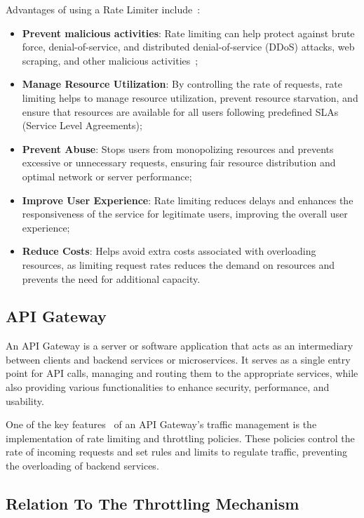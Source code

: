 Advantages of using a Rate Limiter include~\cite{solo-io-rate-limiting, kong-rate-limiting}:

\begin{itemize}
    \item \textbf{Prevent malicious activities}: Rate limiting can help protect against brute force, denial-of-service, and distributed denial-of-service (DDoS) attacks, web scraping, and other malicious activities~\cite{cloudflare-rate-limiting};
    \item \textbf{Manage Resource Utilization}: By controlling the rate of requests, rate limiting helps to manage resource utilization, prevent resource starvation, and ensure that resources are available for all users following predefined SLAs (Service Level Agreements);
    \item \textbf{Prevent Abuse}: Stops users from monopolizing resources and prevents excessive or unnecessary requests, ensuring fair resource distribution and optimal network or server performance;
    \item \textbf{Improve User Experience}: Rate limiting reduces delays and enhances the responsiveness of the service for legitimate users, improving the overall user experience;
    \item \textbf{Reduce Costs}: Helps avoid extra costs associated with overloading resources, as limiting request rates reduces the demand on resources and prevents the need for additional capacity.
\end{itemize}

\subsection{API Gateway}\label{subsec:rate-limiter-api-gateway}

An API Gateway is a server or software application that acts as an intermediary between clients and backend services or microservices.
It serves as a single entry point for API calls, managing and routing them to the appropriate services, while also providing various functionalities to enhance security, performance, and usability.

One of the key features~\cite{api-gateway} of an API Gateway's traffic management is the implementation of rate limiting and throttling policies.
These policies control the rate of incoming requests and set rules and limits to regulate traffic, preventing the overloading of backend services.

\subsection{Relation To The Throttling Mechanism}\label{subsec:rate-limiter-throttling}

